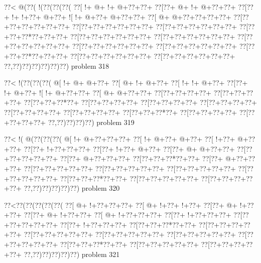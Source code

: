 \vbox{\vbox{\goo
\0??<\- @(\0??(\- !(\0??(\0??(\0??(
\0??[\- !+\- @+\- !+\- @+\0??+\0??+
\0??[\0??+\- @+\- !+\- @+\0??+\0??+
\0??[\0??+\- !+\- !+\0??+\- @+\0??+
\- ![\- !+\- @+\0??+\- @+\0??+\0??+
\0??[\- @+\- @+\0??+\0??+\0??+\0??+
\0??[\0??+\0??+\0??+\0??+\0??+\0??+
\0??[\0??+\0??+\0??+\0??+\0??+\0??+
\0??[\0??+\0??+\0??+\0??+\0??+\0??+
\0??[\0??+\0??+\0??*\0??+\0??+\0??+
\0??[\0??+\0??+\0??+\0??+\0??+\0??+
\0??[\0??+\0??+\0??+\0??+\0??+\0??+
\0??[\0??+\0??+\0??+\0??+\0??+\0??+
\0??[\0??+\0??+\0??+\0??+\0??+\0??+
\0??[\0??+\0??+\0??+\0??+\0??+\0??+
\0??[\0??+\0??+\0??*\0??+\0??+\0??+
\0??[\0??+\0??+\0??+\0??+\0??+\0??+
\0??[\0??+\0??+\0??+\0??+\0??+\0??+
\0??,\0??)\0??)\0??)\0??)\0??)\0??)
}
\hfil problem 318\hfil\break
}

\vbox{\vbox{\goo
\0??<\- !(\0??(\0??(\0??(
\- @[\- !+\- @+\- @+\0??+
\0??[\- @+\- !+\- @+\0??+
\0??[\- !+\- !+\- @+\0??+
\0??[\0??+\- !+\- @+\0??+
\- ![\- !+\- @+\0??+\0??+
\0??[\- @+\- @+\0??+\0??+
\0??[\0??+\0??+\0??+\0??+
\0??[\0??+\0??+\0??+\0??+
\0??[\0??+\0??+\0??*\0??+
\0??[\0??+\0??+\0??+\0??+
\0??[\0??+\0??+\0??+\0??+
\0??[\0??+\0??+\0??+\0??+
\0??[\0??+\0??+\0??+\0??+
\0??[\0??+\0??+\0??+\0??+
\0??[\0??+\0??+\0??*\0??+
\0??[\0??+\0??+\0??+\0??+
\0??[\0??+\0??+\0??+\0??+
\0??,\0??)\0??)\0??)\0??)
}
\hfil problem 319\hfil\break
}

\vbox{\vbox{\goo
\0??<\- !(\- @(\0??(\0??(\0??(
\- @[\- !+\- @+\0??+\0??+\0??+
\0??[\- !+\- @+\0??+\- @+\0??+
\0??[\- !+\0??+\- @+\0??+\0??+
\0??[\0??+\- !+\0??+\0??+\0??+
\0??[\0??+\- !+\0??+\- @+\0??+
\0??[\0??+\- @+\- @+\0??+\0??+
\0??[\0??+\0??+\0??+\0??+\0??+
\0??[\0??+\- @+\0??+\0??+\0??+
\0??[\0??+\0??+\0??*\0??+\0??+
\0??[\0??+\- @+\0??+\0??+\0??+
\0??[\0??+\0??+\0??+\0??+\0??+
\0??[\0??+\0??+\0??+\0??+\0??+
\0??[\0??+\0??+\0??+\0??+\0??+
\0??[\0??+\0??+\0??+\0??+\0??+
\0??[\0??+\0??+\0??*\0??+\0??+
\0??[\0??+\0??+\0??+\0??+\0??+
\0??[\0??+\0??+\0??+\0??+\0??+
\0??,\0??)\0??)\0??)\0??)\0??)
}
\hfil problem 320\hfil\break
}

\vbox{\vbox{\goo
\0??<\0??(\0??(\0??(\0??(\0??(
\0??[\- @+\- !+\0??+\0??+\0??+
\0??[\- @+\- !+\0??+\- !+\0??+
\0??[\0??+\- @+\- !+\0??+\0??+
\0??[\0??+\- @+\- !+\0??+\0??+
\0??[\- @+\- !+\0??+\0??+\0??+
\0??[\0??+\- !+\0??+\0??+\0??+
\0??[\0??+\0??+\0??+\0??+\0??+
\0??[\0??+\- !+\0??+\0??+\0??+
\0??[\0??+\0??+\0??*\0??+\0??+
\0??[\0??+\0??+\0??+\0??+\0??+
\0??[\0??+\0??+\0??+\0??+\0??+
\0??[\0??+\0??+\0??+\0??+\0??+
\0??[\0??+\0??+\0??+\0??+\0??+
\0??[\0??+\0??+\0??+\0??+\0??+
\0??[\0??+\0??+\0??*\0??+\0??+
\0??[\0??+\0??+\0??+\0??+\0??+
\0??[\0??+\0??+\0??+\0??+\0??+
\0??,\0??)\0??)\0??)\0??)\0??)
}
\hfil problem 321\hfil\break
}

